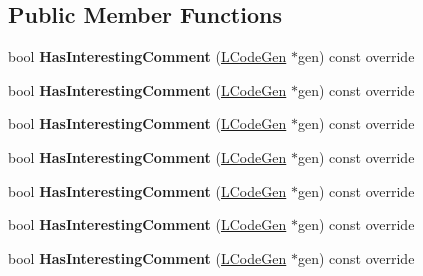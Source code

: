 \subsection*{Public Member Functions}
\begin{DoxyCompactItemize}
\item 
bool {\bfseries Has\+Interesting\+Comment} (\hyperlink{classv8_1_1internal_1_1_l_code_gen}{L\+Code\+Gen} $\ast$gen) const  override\hypertarget{classv8_1_1internal_1_1_l_osr_entry_a2d7c8b5af2302b1d661967e5fd99a655}{}\label{classv8_1_1internal_1_1_l_osr_entry_a2d7c8b5af2302b1d661967e5fd99a655}

\item 
bool {\bfseries Has\+Interesting\+Comment} (\hyperlink{classv8_1_1internal_1_1_l_code_gen}{L\+Code\+Gen} $\ast$gen) const  override\hypertarget{classv8_1_1internal_1_1_l_osr_entry_a2d7c8b5af2302b1d661967e5fd99a655}{}\label{classv8_1_1internal_1_1_l_osr_entry_a2d7c8b5af2302b1d661967e5fd99a655}

\item 
bool {\bfseries Has\+Interesting\+Comment} (\hyperlink{classv8_1_1internal_1_1_l_code_gen}{L\+Code\+Gen} $\ast$gen) const  override\hypertarget{classv8_1_1internal_1_1_l_osr_entry_a2d7c8b5af2302b1d661967e5fd99a655}{}\label{classv8_1_1internal_1_1_l_osr_entry_a2d7c8b5af2302b1d661967e5fd99a655}

\item 
bool {\bfseries Has\+Interesting\+Comment} (\hyperlink{classv8_1_1internal_1_1_l_code_gen}{L\+Code\+Gen} $\ast$gen) const  override\hypertarget{classv8_1_1internal_1_1_l_osr_entry_a2d7c8b5af2302b1d661967e5fd99a655}{}\label{classv8_1_1internal_1_1_l_osr_entry_a2d7c8b5af2302b1d661967e5fd99a655}

\item 
bool {\bfseries Has\+Interesting\+Comment} (\hyperlink{classv8_1_1internal_1_1_l_code_gen}{L\+Code\+Gen} $\ast$gen) const  override\hypertarget{classv8_1_1internal_1_1_l_osr_entry_a2d7c8b5af2302b1d661967e5fd99a655}{}\label{classv8_1_1internal_1_1_l_osr_entry_a2d7c8b5af2302b1d661967e5fd99a655}

\item 
bool {\bfseries Has\+Interesting\+Comment} (\hyperlink{classv8_1_1internal_1_1_l_code_gen}{L\+Code\+Gen} $\ast$gen) const  override\hypertarget{classv8_1_1internal_1_1_l_osr_entry_a2d7c8b5af2302b1d661967e5fd99a655}{}\label{classv8_1_1internal_1_1_l_osr_entry_a2d7c8b5af2302b1d661967e5fd99a655}

\item 
bool {\bfseries Has\+Interesting\+Comment} (\hyperlink{classv8_1_1internal_1_1_l_code_gen}{L\+Code\+Gen} $\ast$gen) const  override\hypertarget{classv8_1_1internal_1_1_l_osr_entry_a2d7c8b5af2302b1d661967e5fd99a655}{}\label{classv8_1_1internal_1_1_l_osr_entry_a2d7c8b5af2302b1d661967e5fd99a655}


\end{DoxyCompactItemize}
